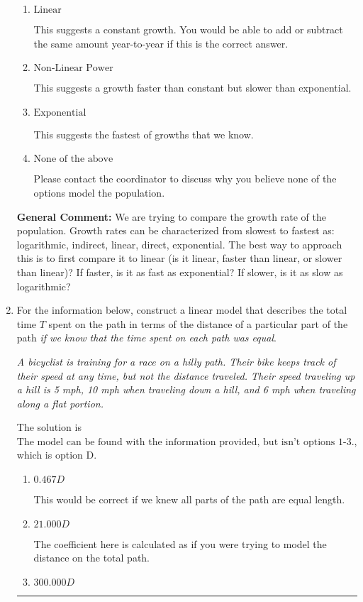 \documentclass{extbook}[14pt]
\newcommand{\litem}[1]{\item #1

\rule{\textwidth}{0.4pt}}
\begin{document}
\begin{enumerate}
{\begin{enumerate}[label=\Alph*.]
This suggests the slowest of growths that we know.
\item \( \text{Linear} \)

This suggests a constant growth. You would be able to add or subtract the same amount year-to-year if this is the correct answer.
\item \( \text{Non-Linear Power} \)

This suggests a growth faster than constant but slower than exponential.
\item \( \text{Exponential} \)

This suggests the fastest of growths that we know.
\item \( \text{None of the above} \)

Please contact the coordinator to discuss why you believe none of the options model the population.
\end{enumerate}

\textbf{General Comment:} We are trying to compare the growth rate of the population. Growth rates can be characterized from slowest to fastest as: logarithmic, indirect, linear, direct, exponential. The best way to approach this is to first compare it to linear (is it linear, faster than linear, or slower than linear)? If faster, is it as fast as exponential? If slower, is it as slow as logarithmic?
}
\litem{
For the information below, construct a linear model that describes the total time $T$ spent on the path in terms of the distance of a particular part of the path \textit{if we know that the time spent on each path was equal}.

\begin{center}
    \textit{ A bicyclist is training for a race on a hilly path. Their bike keeps track of their speed at any time, but not the distance traveled. Their speed traveling up a hill is 5 mph, 10 mph when traveling down a hill, and 6 mph when traveling along a flat portion. }
\end{center}
The solution is \( \text{The model can be found with the information provided, but isn't options 1-3.} \), which is option D.\begin{enumerate}[label=\Alph*.]
\item \( 0.467 D \)

This would be correct if we knew all parts of the path are equal length.
\item \( 21.000 D \)

The coefficient here is calculated as if you were trying to model the distance on the total path.
\item \( 300.000 D \)


\end{enumerate}}
\end{enumerate}
\end{document}
